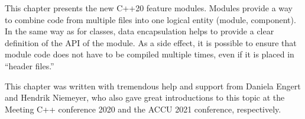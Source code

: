 This chapter presents the new C++20 feature modules. Modules provide a way to combine code from multiple files into one logical entity (module, component). In the same way as for classes, data encapsulation helps to provide a clear definition of the API of the module. As a side effect, it is possible to ensure that module code does not have to be compiled multiple times, even if it is placed in “header files.”

This chapter was written with tremendous help and support from Daniela Engert and Hendrik Niemeyer, who also gave great introductions to this topic at the Meeting C++ conference 2020 and the ACCU 2021 conference, respectively.